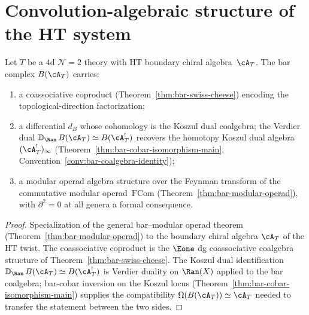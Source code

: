 \section{Convolution-algebraic structure of the HT system}
\label{sec:ht-convolution-structure}

\begin{proposition}
\label{prop:ht-bar-genus-zero}
Let $T$ be a $4$d $\mathcal{N}=2$ theory with HT boundary chiral
algebra~$\cA_T$. The bar complex $B(\cA_T)$ carries:
\begin{enumerate}[label=\textup{(\roman*)}]
\item a coassociative coproduct
 \textup{(}Theorem~\textup{\ref{thm:bar-swiss-cheese}}\textup{)}
 encoding the topological-direction factorization;
\item a differential $d_B$ whose cohomology is the Koszul dual
 coalgebra; the Verdier dual
 $\mathbb{D}_{\Ran}\,B(\cA_T) \simeq B(\cA_T^!)$
 recovers the homotopy Koszul dual algebra $(\cA_T^!)_\infty$
 \textup{(}Theorem~\textup{\ref{thm:bar-cobar-isomorphism-main}},
 Convention~\textup{\ref{conv:bar-coalgebra-identity}}\textup{)};
\item a modular operad algebra structure over the Feynman transform of
 the commutative modular operad~$\mathrm{FCom}$
 \textup{(}Theorem~\textup{\ref{thm:bar-modular-operad}}\textup{)},
 with $\partial^2 = 0$ at all genera a formal consequence.
\end{enumerate}
\end{proposition}

\begin{proof}
Specialization of the general bar--modular operad theorem
(Theorem~\ref{thm:bar-modular-operad}) to the boundary chiral
algebra $\cA_T$ of the HT twist. The coassociative coproduct is
the $\Eone$ dg coassociative coalgebra structure of
Theorem~\ref{thm:bar-swiss-cheese}. The Koszul dual identification
$\mathbb{D}_{\Ran}\,B(\cA_T) \simeq B(\cA_T^!)$ is Verdier
duality on $\Ran(X)$ applied to the bar coalgebra; bar-cobar
inversion on the Koszul locus
(Theorem~\ref{thm:bar-cobar-isomorphism-main}) supplies the
compatibility $\Omega(B(\cA_T)) \simeq \cA_T$ needed to transfer
the statement between the two sides.
\end{proof}

